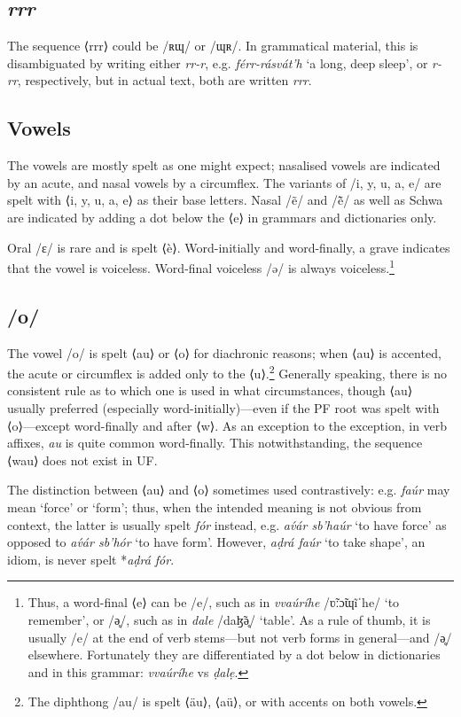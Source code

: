 \documentclass[a4paper, 12pt, twoside, openright, final]{book}
\let \w \textit
\begin{document}
\subsection{\textit{rrr}}
The sequence ⟨rrr⟩ could be /ʀɰ/ or /ɰʀ/. In grammatical material, this is disambiguated by writing either \w{rr-r}, e.g.
\w{férr-rásvát’h} ‘a long, deep sleep’, or \w{r-rr}, respectively, but in actual text, both are written \w{rrr}.

\subsection{Vowels}
The vowels are mostly spelt as one might expect; nasalised vowels are indicated by an acute, and nasal vowels by a circumflex.
The variants of /i, y, u, a, e/ are spelt with ⟨i, y, u, a, e⟩ as their base letters. Nasal /ẽ/ and /ẽ̃/ as well as Schwa are
indicated by adding a dot below the ⟨e⟩ in grammars and dictionaries only.

Oral /ɛ/ is rare and is spelt ⟨è⟩. Word-initially and word-finally, a grave indicates that the vowel is voiceless. Word-final
voiceless /ə/ is always voiceless.\footnote{Thus, a word-final ⟨e⟩
can be /e/, such as in \w{vvaúríhe} /ʋ̃ːɔ̃ɰĩˈhe/ ‘to remember’, or /ə̥/, such as in \w{dale} /daɮ̃ə̥/ ‘table’. As a rule of thumb, it is
usually /e/ at the end of verb stems—but not verb forms in general—and /ə̥/ elsewhere. Fortunately they are differentiated by a
dot below in dictionaries and in this grammar: \w{vvaúríhe} vs \w{ḍalẹ}.}

\subsection{/o/}

The vowel /o/ is spelt ⟨au⟩ or ⟨o⟩ for diachronic reasons; when ⟨au⟩ is accented, the acute or circumflex is added only to the
⟨u⟩.\footnote{The diphthong /au/ is spelt ⟨äu⟩, ⟨aü⟩, or with accents on both vowels.} Generally speaking, there is no consistent
rule as to which one is used in what circumstances, though ⟨au⟩ usually preferred (especially word-initially)—even if the
PF root was spelt with ⟨o⟩—except word-finally and after ⟨w⟩. As an exception to the exception, in verb affixes, \w{au} is quite
common word-finally. This notwithstanding, the sequence ⟨wau⟩ does not exist in UF.

The distinction between ⟨au⟩ and ⟨o⟩ sometimes used contrastively: e.g. \w{faúr} may mean ‘force’ or ‘form’; thus, when the
intended meaning is not obvious from context, the latter is usually spelt \w{fór} instead, e.g. \w{av́ár sb’haúr} ‘to have force’
as opposed to \w{av́ár sb’hór} ‘to have form’. However, \w{aḍrá faúr} ‘to take shape’, an idiom, is never spelt *\w{aḍrá fór}.
\end{document}
